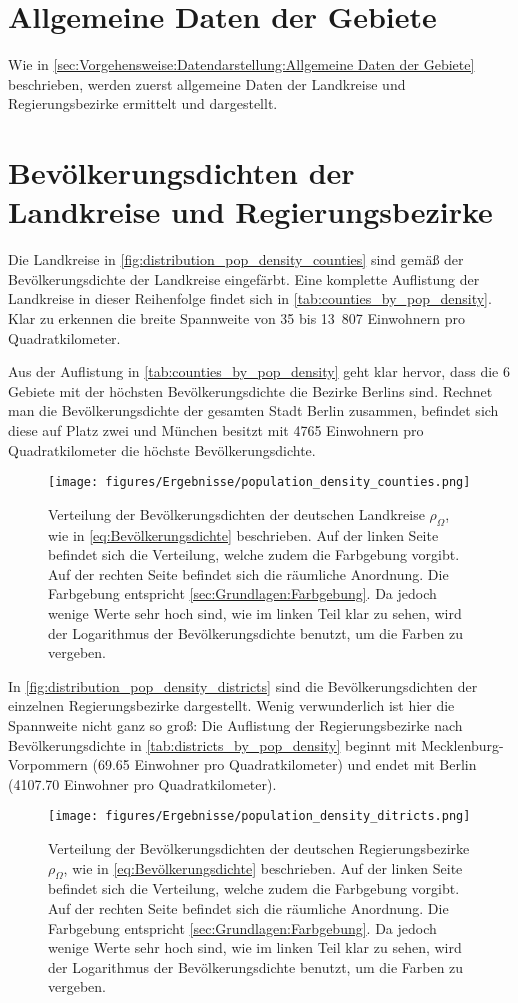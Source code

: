 \section{Allgemeine Daten der Gebiete}
Wie in \autoref{sec:Vorgehensweise:Datendarstellung:Allgemeine Daten der Gebiete} beschrieben, werden zuerst allgemeine Daten der Landkreise und Regierungsbezirke ermittelt und dargestellt.
\section{Bevölkerungsdichten der Landkreise und Regierungsbezirke}
Die Landkreise in \autoref{fig:distribution_pop_density_counties} sind gemäß der Bevölkerungsdichte der Landkreise eingefärbt. Eine komplette Auflistung der Landkreise in dieser Reihenfolge findet sich in \autoref{tab:counties_by_pop_density}.
Klar zu erkennen die breite Spannweite von 35 bis 13~807 Einwohnern pro Quadratkilometer.

Aus der Auflistung in \autoref{tab:counties_by_pop_density} geht klar hervor, dass die 6 Gebiete mit der höchsten Bevölkerungsdichte die Bezirke Berlins sind. Rechnet man die Bevölkerungsdichte der gesamten Stadt Berlin zusammen, befindet sich diese auf Platz zwei und München besitzt mit 4765 Einwohnern pro Quadratkilometer die höchste Bevölkerungsdichte. 
\begin{figure}[H]
    \centering
    \texttt{[image: figures/Ergebnisse/population\_density\_counties.png]}
    \caption{Verteilung der Bevölkerungsdichten der deutschen Landkreise $\rho_{\Omega}$, wie in \autoref{eq:Bevölkerungsdichte} beschrieben. Auf der linken Seite befindet sich die Verteilung, welche zudem die Farbgebung vorgibt. Auf der rechten Seite befindet sich die räumliche Anordnung. Die Farbgebung entspricht \autoref{sec:Grundlagen:Farbgebung}. Da jedoch wenige Werte sehr hoch sind, wie im linken Teil klar zu sehen, wird der Logarithmus der Bevölkerungsdichte benutzt, um die Farben zu vergeben.}
    \label{fig:distribution_pop_density_counties}
\end{figure}
\newpage
In \autoref{fig:distribution_pop_density_districts} sind die Bevölkerungsdichten der einzelnen Regierungsbezirke dargestellt. Wenig verwunderlich ist hier die Spannweite nicht ganz so groß: Die Auflistung der Regierungsbezirke nach Bevölkerungsdichte in \autoref{tab:districts_by_pop_density} beginnt mit Mecklenburg-Vorpommern (69.65 Einwohner pro Quadratkilometer) und endet mit Berlin (4107.70 Einwohner pro Quadratkilometer).

\begin{figure}[H]
    \centering
    \texttt{[image: figures/Ergebnisse/population\_density\_ditricts.png]}
    \caption{Verteilung der Bevölkerungsdichten der deutschen Regierungsbezirke $\rho_{\Omega}$, wie in \autoref{eq:Bevölkerungsdichte} beschrieben. Auf der linken Seite befindet sich die Verteilung, welche zudem die Farbgebung vorgibt. Auf der rechten Seite befindet sich die räumliche Anordnung. Die Farbgebung entspricht \autoref{sec:Grundlagen:Farbgebung}. Da jedoch wenige Werte sehr hoch sind, wie im linken Teil klar zu sehen, wird der Logarithmus der Bevölkerungsdichte benutzt, um die Farben zu vergeben.}
    \label{fig:distribution_pop_density_districts}
\end{figure}